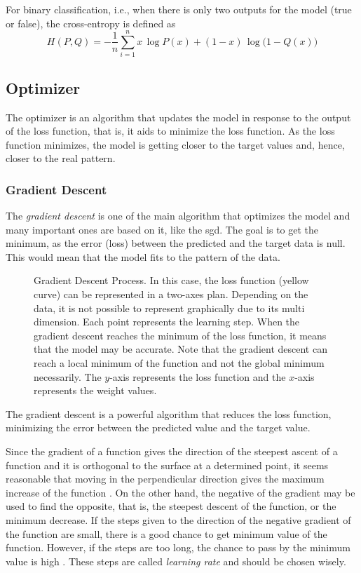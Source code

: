 For binary classification, i.e., when there is only two outputs for the model (true or false), the cross-entropy is defined as
%
\begin{equation}
    H(P,Q) = - \frac{1}{n} \sum_{i=1}^n x \, \log P(x) + (1-x) \, \log \Big(1-Q(x)\Big)
    \label{eq:binary_cross_entropy}
\end{equation}

\subsection{Optimizer}\label{sec:optimizer}

The optimizer is an algorithm that updates the model in response to the output of the loss function, that is, it aids to minimize the loss function. 
As the loss function minimizes, the model is getting closer to the target values and, hence, closer to the real pattern.

\subsubsection*{Gradient Descent} 

The \emph{gradient descent} is one of the main algorithm \citep{nesterov2004} that optimizes the model and many important ones are based on it, like the \gls*{sgd}. The goal is to get the minimum, as the error (loss) between the predicted and the target data is null. This would mean that the model fits to the pattern of the data.
%
\begin{figure}[!htb]
    \centering
    
    \caption[Gradient Descent Process]{Gradient Descent Process. In this case, the loss function (yellow curve) can be represented in a two-axes plan. Depending on the data, it is not possible to represent graphically due to its multi dimension. Each point represents the learning step. When the gradient descent reaches the minimum of the loss function, it means that the model may be accurate. Note that the gradient descent can reach a local minimum of the function and not the global minimum necessarily. The \(y\)-axis represents the loss function and the \(x\)-axis represents the weight values.}
\end{figure}

The gradient descent is a powerful algorithm that reduces the loss function, minimizing the error between the predicted value and the target value.

Since the gradient of a function gives the direction of the steepest ascent of a function and it is orthogonal to the surface at a determined point, it seems reasonable that moving in the perpendicular direction gives the maximum increase of the function \citep{stewart2016}.
On the other hand, the negative of the gradient may be used to find the opposite, that is, the steepest descent of the function, or the minimum decrease.
If the steps given to the direction of the negative gradient of the function are small, there is a good chance to get minimum value of the function.
However, if the steps are too long, the chance to pass by the minimum value is high \citep{nielsen2015}.
These steps are called \emph{learning rate} and should be chosen wisely.

